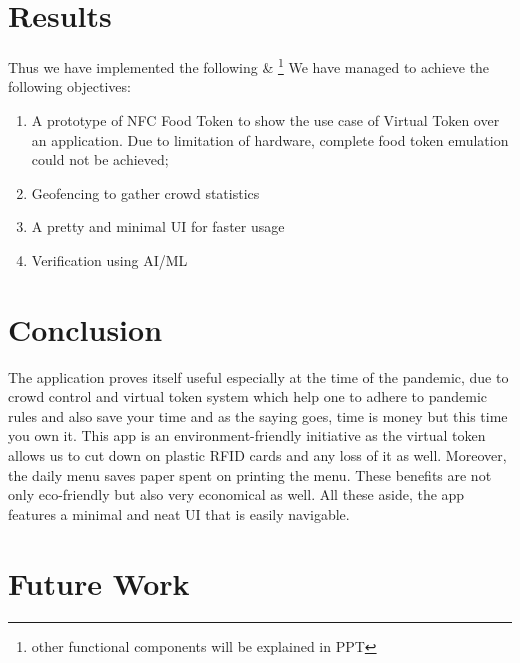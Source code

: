 \documentclass[12pt]{article}
\begin{document}
\section*{\LARGE{Results}}

{\justify
Thus we have implemented the following  \&  \footnote{other functional components will be explained in PPT}
\vskip0.2cm
We have managed to achieve the following objectives:

\begin{enumerate}
\item A prototype of NFC Food Token to show the use case of Virtual Token over an application. Due to limitation of hardware, complete food token emulation could not be achieved;
\item Geofencing to gather crowd statistics
\item A pretty and minimal UI for faster usage
\item Verification using AI/ML
\end{enumerate}}

\section*{\LARGE{Conclusion}}

{\justify
The application proves itself useful especially at the time of the pandemic, due to crowd control and virtual token system which help one to adhere to pandemic rules and also save your time and as the saying goes, time is money but this time you own it. This app is an environment-friendly initiative as the virtual token allows us to cut down on plastic \gls{RFID} cards and any loss of it as well. Moreover, the daily menu saves paper spent on printing the menu. These benefits are not only eco-friendly but also very economical as well. All these aside, the app features a minimal and neat UI that is easily navigable.
}

\section*{\LARGE{Future Work}}
\end{document}

